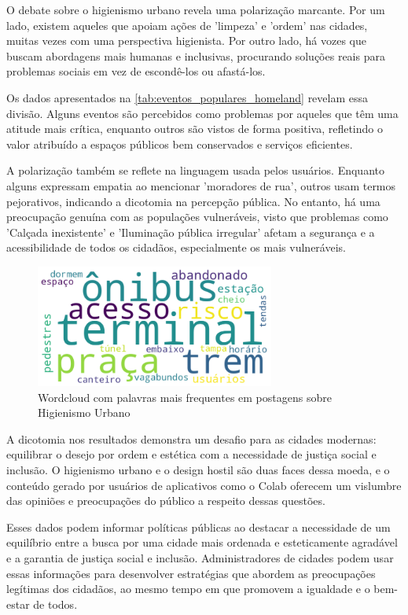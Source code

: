 O debate sobre o higienismo urbano revela uma polarização marcante. Por um lado, existem aqueles que apoiam ações de 'limpeza' e 'ordem' nas cidades, muitas vezes com uma perspectiva higienista. Por outro lado, há vozes que buscam abordagens mais humanas e inclusivas, procurando soluções reais para problemas sociais em vez de escondê-los ou afastá-los.

Os dados apresentados na \autoref{tab:eventos_populares_homeland} revelam essa divisão. Alguns eventos são percebidos como problemas por aqueles que têm uma atitude mais crítica, enquanto outros são vistos de forma positiva, refletindo o valor atribuído a espaços públicos bem conservados e serviços eficientes.

A polarização também se reflete na linguagem usada pelos usuários. Enquanto alguns expressam empatia ao mencionar 'moradores de rua', outros usam termos pejorativos, indicando a dicotomia na percepção pública. No entanto, há uma preocupação genuína com as populações vulneráveis, visto que problemas como 'Calçada inexistente' e 'Iluminação pública irregular' afetam a segurança e a acessibilidade de todos os cidadãos, especialmente os mais vulneráveis.

\begin{figure}[htb]
	\centering
	\includegraphics[width=0.7\textwidth]{images/wordcloud_homepand.png}
	\caption{Wordcloud com palavras mais frequentes em postagens sobre Higienismo Urbano}
	\label{fig:wordcloud_homepand}
\end{figure}

A dicotomia nos resultados demonstra um desafio para as cidades modernas: equilibrar o desejo por ordem e estética com a necessidade de justiça social e inclusão. O higienismo urbano e o design hostil são duas faces dessa moeda, e o conteúdo gerado por usuários de aplicativos como o Colab oferecem um vislumbre das opiniões e preocupações do público a respeito dessas questões.

Esses dados podem informar políticas públicas ao destacar a necessidade de um equilíbrio entre a busca por uma cidade mais ordenada e esteticamente agradável e a garantia de justiça social e inclusão. Administradores de cidades podem usar essas informações para desenvolver estratégias que abordem as preocupações legítimas dos cidadãos, ao mesmo tempo em que promovem a igualdade e o bem-estar de todos.

